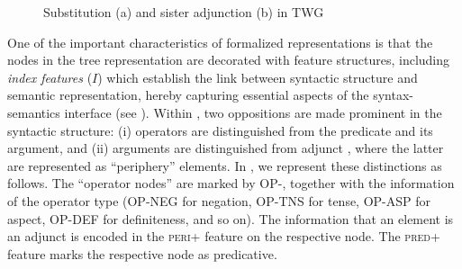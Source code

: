 \documentclass[output=paper,colorlinks,citecolor=brown]{langscibook}
\begin{document}
\begin{figure}[H]
{
}

\caption{Substitution (a) and sister adjunction (b) in TWG} \label{fig:twg.syn:Balogh}
\end{figure}

One of the important characteristics of formalized  representations is that the nodes in the tree representation are decorated with feature structures, including \textit{index features} ($I$) which establish the link between syntactic structure and semantic representation, hereby capturing essential aspects of the syntax-semantics interface (see ). Within , two oppositions are made prominent in the syntactic structure: (i) operators are distinguished from the predicate and its argument, and (ii) arguments are distinguished from adjunct , where the latter are represented as ``periphery'' elements. In , we represent these distinctions as follows. The ``operator nodes'' are marked by OP-, together with the information of the operator type (OP-NEG for negation, OP-TNS for tense, OP-ASP for aspect, OP-DEF for definiteness, and so on). The information that an element is an adjunct  is encoded in the {\textsc{peri+}} feature on the respective node. The {\textsc{pred+}} feature marks the respective node as predicative. 
\end{document}
